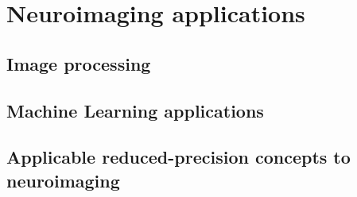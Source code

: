 \chapter{Neuroimaging applications}
\begin{comment}
This section will discuss:
1. Image processing in neuroimaging
2. ML applications
3. Applicable RP concepts to neuroimaging

In the first 2 bullet point, talk in about the general field, then focus on the
main topic of interest.
Setup the context of the topic to justify the methods used.
\end{comment}

\section{Image processing}

\section{Machine Learning applications}

\section{Applicable reduced-precision concepts to neuroimaging}
